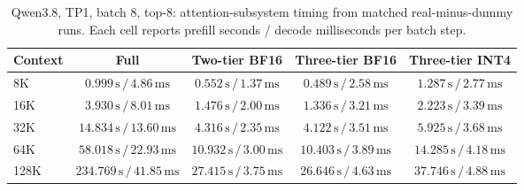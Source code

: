 \begin{table}[t]
\centering
\small
\caption{Qwen3.8, TP1, batch 8, top-8: attention-subsystem timing from matched real-minus-dummy runs. Each cell reports prefill seconds / decode milliseconds per batch step.}
\label{tab:prolong-qwen38-tp1-b8-attention-core}
\begin{tabular}{lcccc}
\toprule
Context & Full & Two-tier BF16 & Three-tier BF16 & Three-tier INT4 \\
\midrule
8K & \(0.999\,\mathrm{s}\,/\,4.86\,\mathrm{ms}\) & \(0.552\,\mathrm{s}\,/\,1.37\,\mathrm{ms}\) & \(0.489\,\mathrm{s}\,/\,2.58\,\mathrm{ms}\) & \(1.287\,\mathrm{s}\,/\,2.77\,\mathrm{ms}\) \\
16K & \(3.930\,\mathrm{s}\,/\,8.01\,\mathrm{ms}\) & \(1.476\,\mathrm{s}\,/\,2.00\,\mathrm{ms}\) & \(1.336\,\mathrm{s}\,/\,3.21\,\mathrm{ms}\) & \(2.223\,\mathrm{s}\,/\,3.39\,\mathrm{ms}\) \\
32K & \(14.834\,\mathrm{s}\,/\,13.60\,\mathrm{ms}\) & \(4.316\,\mathrm{s}\,/\,2.35\,\mathrm{ms}\) & \(4.122\,\mathrm{s}\,/\,3.51\,\mathrm{ms}\) & \(5.925\,\mathrm{s}\,/\,3.68\,\mathrm{ms}\) \\
64K & \(58.018\,\mathrm{s}\,/\,22.93\,\mathrm{ms}\) & \(10.932\,\mathrm{s}\,/\,3.00\,\mathrm{ms}\) & \(10.403\,\mathrm{s}\,/\,3.89\,\mathrm{ms}\) & \(14.285\,\mathrm{s}\,/\,4.18\,\mathrm{ms}\) \\
128K & \(234.769\,\mathrm{s}\,/\,41.85\,\mathrm{ms}\) & \(27.415\,\mathrm{s}\,/\,3.75\,\mathrm{ms}\) & \(26.646\,\mathrm{s}\,/\,4.63\,\mathrm{ms}\) & \(37.746\,\mathrm{s}\,/\,4.88\,\mathrm{ms}\) \\
\bottomrule
\end{tabular}
\end{table}


